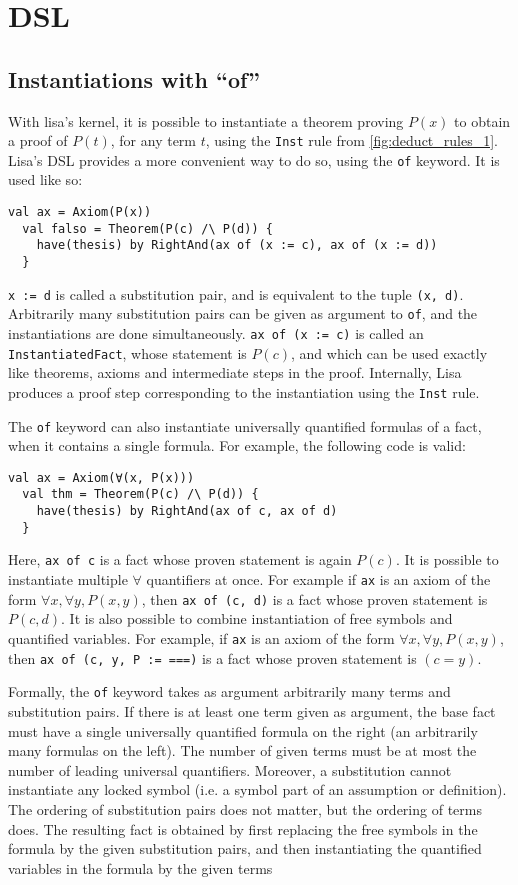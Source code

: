 \section{DSL}

\subsection{Instantiations with ``of''}

With lisa's kernel, it is possible to instantiate a theorem proving $P(x)$ to obtain a proof of $P(t)$, for any term $t$, using the \texttt{Inst} rule from \autoref{fig:deduct_rules_1}. Lisa's DSL provides a more convenient way to do so, using the \lstinline|of| keyword. It is used like so:
\begin{lstlisting}[language=lisa, frame=single]
  val ax = Axiom(P(x))
  val falso = Theorem(P(c) /\ P(d)) {
    have(thesis) by RightAnd(ax of (x := c), ax of (x := d))
  }
\end{lstlisting}
\lstinline|x := d| is called a substitution pair, and is equivalent to the tuple \lstinline|(x, d)|. Arbitrarily many substitution pairs can be given as argument to \lstinline|of|, and the instantiations are done simultaneously. \lstinline|ax of (x := c)| is called an \lstinline|InstantiatedFact|, whose statement is $P(c)$, and which can be used exactly like theorems, axioms and intermediate steps in the proof. Internally, Lisa produces a proof step corresponding to the instantiation using the \texttt{Inst} rule.

The \lstinline|of| keyword can also instantiate universally quantified formulas of a fact, when it contains a single formula. For example, the following code is valid:
\begin{lstlisting}[language=lisa, frame=single]
  val ax = Axiom(∀(x, P(x)))
  val thm = Theorem(P(c) /\ P(d)) {
    have(thesis) by RightAnd(ax of c, ax of d)
  }
\end{lstlisting}
Here, \lstinline|ax of c| is a fact whose proven statement is again $P(c)$. It is possible to instantiate multiple $\forall$ quantifiers at once. For example if \lstinline|ax| is an axiom of the form $∀ x, ∀ y, P(x, y)$, then \lstinline|ax of (c, d)| is a fact whose proven statement is $P(c, d)$. It is also possible to combine instantiation of free symbols and quantified variables. For example, if \lstinline|ax| is an axiom of the form $∀ x, ∀ y, P(x, y)$, then \lstinline|ax of (c, y, P := ===)| is a fact whose proven statement is $(c = y)$.

Formally, the \lstinline|of| keyword takes as argument arbitrarily many terms and substitution pairs. If there is at least one term given as argument, the base fact must have a single universally quantified formula on the right (an arbitrarily many formulas on the left). The number of given terms must be at most the number of leading universal quantifiers. Moreover, a substitution cannot instantiate any locked symbol (i.e. a symbol part of an assumption or definition). The ordering of substitution pairs does not matter, but the ordering of terms does. The resulting fact is obtained by first replacing the free symbols in the formula by the given substitution pairs, and then instantiating the quantified variables in the formula by the given terms

